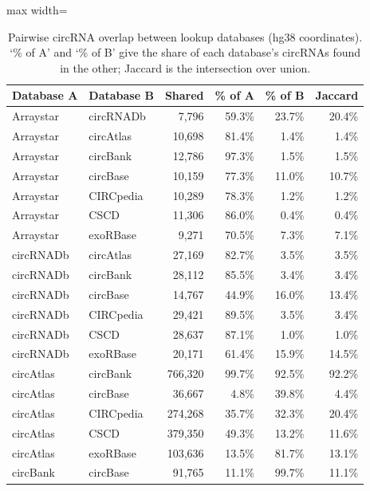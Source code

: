 \begin{table}[ht]
  \centering
  \caption[Pairwise circRNA overlap between lookup databases (hg38 coordinates)]{Pairwise circRNA overlap between lookup databases (hg38 coordinates). `\% of A' and `\% of B' give the share of each database's circRNAs found in the other; Jaccard is the intersection over union.}
  \label{pycircsupptab4}
  \footnotesize
  \begin{adjustbox}{max width=\textwidth}
  \begin{tabular}{llrrrr}
    \toprule
    Database A & Database B & Shared & \% of A & \% of B & Jaccard \\
    \midrule
    Arraystar & circRNADb & 7,796 & 59.3\% & 23.7\% & 20.4\% \\
    Arraystar & circAtlas & 10,698 & 81.4\% & 1.4\% & 1.4\% \\
    Arraystar & circBank & 12,786 & 97.3\% & 1.5\% & 1.5\% \\
    Arraystar & circBase & 10,159 & 77.3\% & 11.0\% & 10.7\% \\
    Arraystar & CIRCpedia & 10,289 & 78.3\% & 1.2\% & 1.2\% \\
    Arraystar & CSCD & 11,306 & 86.0\% & 0.4\% & 0.4\% \\
    Arraystar & exoRBase & 9,271 & 70.5\% & 7.3\% & 7.1\% \\
    circRNADb & circAtlas & 27,169 & 82.7\% & 3.5\% & 3.5\% \\
    circRNADb & circBank & 28,112 & 85.5\% & 3.4\% & 3.4\% \\
    circRNADb & circBase & 14,767 & 44.9\% & 16.0\% & 13.4\% \\
    circRNADb & CIRCpedia & 29,421 & 89.5\% & 3.5\% & 3.4\% \\
    circRNADb & CSCD & 28,637 & 87.1\% & 1.0\% & 1.0\% \\
    circRNADb & exoRBase & 20,171 & 61.4\% & 15.9\% & 14.5\% \\
    circAtlas & circBank & 766,320 & 99.7\% & 92.5\% & 92.2\% \\
    circAtlas & circBase & 36,667 & 4.8\% & 39.8\% & 4.4\% \\
    circAtlas & CIRCpedia & 274,268 & 35.7\% & 32.3\% & 20.4\% \\
    circAtlas & CSCD & 379,350 & 49.3\% & 13.2\% & 11.6\% \\
    circAtlas & exoRBase & 103,636 & 13.5\% & 81.7\% & 13.1\% \\
    circBank & circBase & 91,765 & 11.1\% & 99.7\% & 11.1\% \\

\end{tabular}
\end{adjustbox}
\end{table}
